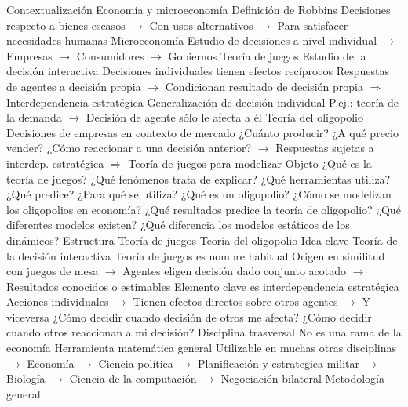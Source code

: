 \documentclass{nuevotema}
\begin{document}
\begin{esquemal}
	\1[] 
		\2 Contextualización
			\3 Economía y microeconomía
				\4 Definición de Robbins
				\4[] Decisiones respecto a bienes escasos
				\4[] $\to$ Con usos alternativos
				\4[] $\to$ Para satisfacer necesidades humanas
				\4 Microeconomía
				\4[] Estudio de decisiones a nivel individual
				\4[] $\to$ Empresas
				\4[] $\to$ Consumidores
				\4[] $\to$ Gobiernos
			\3 Teoría de juegos
				\4 Estudio de la decisión interactiva
				\4[] Decisiones individuales tienen efectos recíprocos
				\4[] Respuestas de agentes a decisión propia
				\4[] $\to$ Condicionan resultado de decisión propia
				\4[] $\Rightarrow$ Interdependencia estratégica
				\4 Generalización de decisión individual
				\4[] P.ej.: teoría de la demanda
				\4[] $\to$ Decisión de agente sólo le afecta a él
			\3 Teoría del oligopolio
				\4 Decisiones de empresas en contexto de mercado
				\4[] ¿Cuánto producir?
				\4[] ¿A qué precio vender?
				\4[] ¿Cómo reaccionar a una decisión anterior?
				\4[] $\to$ Respuestas sujetas a interdep. estratégica
				\4[] $\Rightarrow$ Teoría de juegos para modelizar
		\2 Objeto
			\3 ¿Qué es la teoría de juegos?
				\4 ¿Qué fenómenos trata de explicar?
				\4 ¿Qué herramientas utiliza?
				\4 ¿Qué predice?
				\4 ¿Para qué se utiliza?
			\3 ¿Qué es un oligopolio?
				\4 ¿Cómo se modelizan los oligopolios en economía?
				\4 ¿Qué resultados predice la teoría de oligopolio?
				\4 ¿Qué diferentes modelos existen?
				\4 ¿Qué diferencia los modelos estáticos de los dinámicos?
		\2 Estructura
			\3 Teoría de juegos
			\3 Teoría del oligopolio
	\1 
		\2 Idea clave
			\3 Teoría de la decisión interactiva
				\4 Teoría de juegos es nombre habitual
				\4[] Origen en similitud con juegos de mesa
				\4[] $\to$ Agentes eligen decisión dado conjunto acotado
				\4[] $\to$ Resultados conocidos o estimables
				\4 Elemento clave es interdependencia estratégica
				\4[] Acciones individuales
				\4[] $\to$ Tienen efectos directos sobre otros agentes
				\4[] $\to$ Y viceversa
				\4 ¿Cómo decidir cuando decisión de otros me afecta?
				\4 ¿Cómo decidir cuando otros reaccionan a mi decisión?
			\3 Disciplina trasversal
				\4 No es una rama de la economía
				\4 Herramienta matemática general
				\4[] Utilizable en muchas otras disciplinas
				\4[] $\to$ Economía
				\4[] $\to$ Ciencia política
				\4[] $\to$ Planificación y estrategica militar
				\4[] $\to$ Biología
				\4[] $\to$ Ciencia de la computación
				\4[] $\to$ Negociación bilateral
				\4 Metodología general

\end{esquemal}
\end{document}
